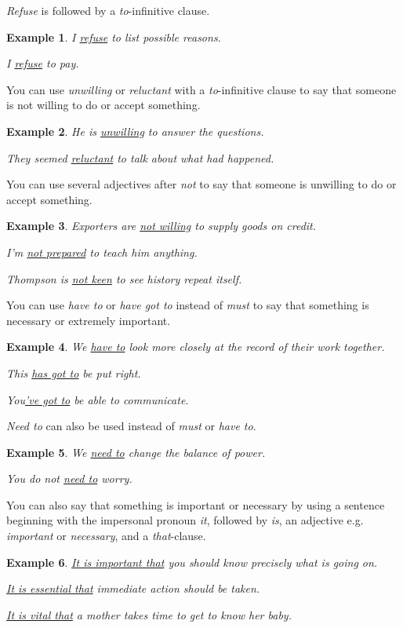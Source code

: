 \documentclass[oneside]{book}
\numberwithin{equation}{section}
\newtheorem{example}{Example}[section]
\begin{document}
\textit{Refuse} is followed by a \textit{to}-infinitive clause.
\begin{example}
    I \underline{refuse} to list possible reasons.
    
    I \underline{refuse} to pay.
\end{example}
%
\noindent{} You can use \textit{unwilling} or \textit{reluctant} with a \textit{to}-infinitive clause to say that someone is not willing to do or accept something.
\begin{example}
    He is \underline{unwilling} to answer the questions.
    
    They seemed \underline{reluctant} to talk about what had happened.
\end{example}
You can use several adjectives after \textit{not} to say that someone is unwilling to do or accept something.
\begin{example}
    Exporters are \underline{not willing} to supply goods on credit.
    
    I'm \underline{not prepared} to teach him anything.
    
    Thompson is \underline{not keen} to see history repeat itself.
\end{example}
%
\noindent{} You can use \textit{have to} or \textit{have got to} instead of \textit{must} to say that something is necessary or extremely important.
\begin{example}
    We \underline{have to} look more closely at the record of their work together.
    
    This \underline{has got to} be put right.
    
    You\underline{'ve got to} be able to communicate.
\end{example}
%
\noindent{} \textit{Need to} can also be used instead of \textit{must} or \textit{have to}.
\begin{example}
    We \underline{need to} change the balance of power.
    
    You do not \underline{need to} worry.
\end{example}
%
\noindent{} You can also say that something is important or necessary by using a sentence beginning with the impersonal pronoun \textit{it}, followed by \textit{is}, an adjective e.g. \textit{important} or \textit{necessary}, and a \textit{that}-clause.
\begin{example}
    \underline{It is important that} you should know precisely what is going on.
    
    \underline{It is essential that} immediate action should be taken.
    
    \underline{It is vital that} a mother takes time to get to know her baby.
\end{example}
\end{document}

